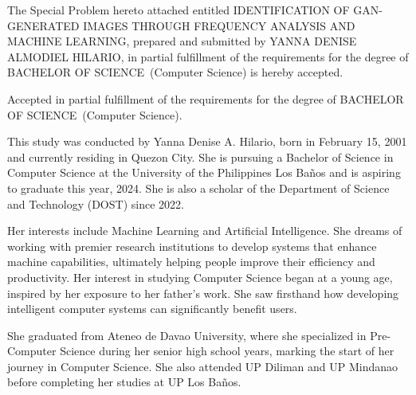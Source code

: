 \documentclass{icsthesis}
\renewcommand{\TITLE}{IDENTIFICATION OF GAN-GENERATED IMAGES THROUGH FREQUENCY ANALYSIS AND MACHINE LEARNING}
\renewcommand{\AUTHOR}{YANNA DENISE ALMODIEL HILARIO}
\renewcommand{\DEGREE}{BACHELOR OF SCIENCE}
\renewcommand{\MAJOR}{Computer Science}
\begin{document}
	
	\begin{frontmatter}
		\maketitle
				
		\begin{approvalpage}
			The Special Problem hereto attached entitled \TITLE , prepared and submitted by \AUTHOR , in partial fulfillment of the requirements for the degree of \DEGREE\ (\MAJOR) is hereby accepted.
			
		\begin{multicols}{2}
				\centering
			\end{multicols}
			
			Accepted in partial fulfillment of the requirements for the degree of \DEGREE\ (\MAJOR). 
		\end{approvalpage}
		
		\begin{biosketch}
			
			This study was conducted by Yanna Denise A. Hilario, born in February 15, 2001 and currently residing in Quezon City. She is pursuing a Bachelor of Science in Computer Science at the University of the Philippines Los Baños and is aspiring to graduate this year, 2024. She is also a scholar of the Department of Science and Technology (DOST) since 2022. 
            
            Her interests include Machine Learning and Artificial Intelligence. She dreams of working with premier research institutions to develop systems that enhance machine capabilities, ultimately helping people improve their efficiency and productivity. Her interest in studying Computer Science began at a young age, inspired by her exposure to her father's work. She saw firsthand how developing intelligent computer systems can significantly benefit users.
            
            She graduated from Ateneo de Davao University, where she specialized in Pre-Computer Science during her senior high school years, marking the start of her journey in Computer Science. She also attended UP Diliman and UP Mindanao before completing her studies at UP Los Baños.
            

\end{biosketch}
\end{frontmatter}
\end{document}
